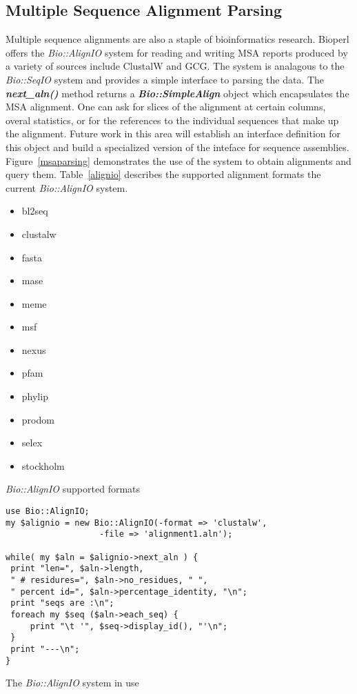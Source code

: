 \documentclass{article}
\begin{document}
\subsection{Multiple Sequence Alignment Parsing}

Multiple sequence alignments are also a staple of bioinformatics
research.  Bioperl offers the \emph{Bio::AlignIO} system for reading
and writing MSA reports produced by a variety of sources include
ClustalW and GCG.  The system is analagous to the \emph{Bio::SeqIO}
system and provides a simple interface to parsing the data.  The {\it
\bf next\_aln()} method returns a \emph{\bf Bio::SimpleAlign} object
which encapsulates the MSA alignment.  One can ask for slices of the
alignment at certain columns, overal statistics, or for the references
to the individual sequences that make up the alignment.  Future work
in this area will establish an interface definition for this object
 and build a specialized version of the inteface for sequence
assemblies.  Figure~\ref{msaparsing} demonstrates the use of the
system to obtain alignments and query them.  Table~\ref{alignio}
describes the supported alignment formats the current
\emph{Bio::AlignIO} system.

\begin{table}[h]
\begin{itemize}
\item bl2seq
\item clustalw
\item fasta
\item mase
\item meme
\item msf
\item nexus
\item pfam
\item phylip
\item prodom
\item selex
\item stockholm
\end{itemize}
\label{alignio}
\caption{\emph{Bio::AlignIO} supported formats}
\end{table}

\begin{table}[h]
\begin{verbatim}
use Bio::AlignIO;
my $alignio = new Bio::AlignIO(-format => 'clustalw',
			       -file => 'alignment1.aln');

while( my $aln = $alignio->next_aln ) {
 print "len=", $aln->length, 
 " # residures=", $aln->no_residues, " ",
 " percent id=", $aln->percentage_identity, "\n";
 print "seqs are :\n";
 foreach my $seq ($aln->each_seq) {
     print "\t '", $seq->display_id(), "'\n";
 }
 print "---\n";
}
\end{verbatim}
\label{msaparsing}
\caption{The \emph{Bio::AlignIO} system in use}
\end{table}
\end{document}
